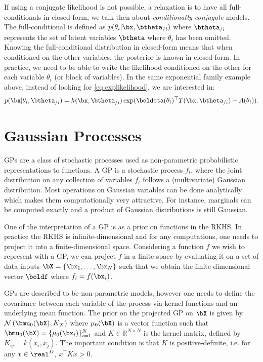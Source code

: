 If using a conjugate likelihood is not possible, a relaxation is to have all full-conditionals in closed-form, we talk then about \textit{conditionally conjugate} models.
The full-conditional is defined as $p(\theta_i|\bx, \btheta_{/i})$ where $\btheta_{/i}$ represents the set of latent variables $\btheta$ where $\theta_i$ has been omitted.
Knowing the full-conditional distribution in closed-form means that when conditioned on the other variables, the posterior is known in closed-form.
In practice, we need to be able to write the likelihood conditioned on the other for each variable $\theta_i$ (or block of variables).
In the same exponential family example above, instead of looking for \eqref{eq:explikelihood}, we are interested in:
\begin{align*}
    p(\bx|\theta_i, \btheta_{/i}) = h(\bx, \btheta_{/i})\exp(\boldeta(\theta_i)^\top T(\bx, \btheta_{/i}) - A(\theta_i)).
\end{align*}

\section{Gaussian Processes}
\label{sec:gps}
\acf{GPs} are a class of stochastic processes used as non-parametric probabilistic representations to functions.
A \ac{GP} is a stochastic process $f_t$, where the joint distribution on any collection of variables $f_t$ follows a (multivariate) Gaussian distribution.
Most operations on Gaussian variables can be done analytically which makes them computationally very attractive.
For instance, marginals can be computed exactly and a product of Gaussian distributions is still Gaussian.

One of the interpretation of a \ac{GP} is as a prior on functions in the \acf{RKHS}.
In practice the \ac{RKHS} is infinite-dimensional and for any computations, one needs to project it into a finite-dimensional space.
Considering a function $f$ we wish to represent with a \ac{GP}, we can project $f$ in a finite space by evaluating it on a set of data inputs $\bX = \{\bx_1, \ldots, \bx_N\}$ such that we obtain the finite-dimensional vector $\boldf$ where $f_i = f(\bx_i)$.

\ac{GPs} are described to be non-parametric models, however one needs to define the covariance between each variable of the process via kernel functions \needcite and an underlying mean function.
The prior on the projected \ac{GP} on $\bX$ is given by $\mathcal{N}\left(\bmu_0(\bX), K_{X}\right)$ where $\mu_0(\bX)$ is a vector function such that $\bmu_0(\bX) = \{\mu_0(\bx_i)\}_{i=1}^N$ and $K \in \mathbb{R}^{N\times N}$ is the kernel matrix, defined by $K_{ij} = k(x_i, x_j)$.
The important condition is that $K$ is positive-definite, i.e. for any $x\in \real^D$, $x^\top K x > 0$.

